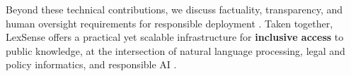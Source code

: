 {Beyond these technical contributions, we discuss factuality, transparency, and human oversight requirements for responsible deployment \cite{ji2023hallucination, maynez2020faithfulness, weidinger2021taxonomy}. Taken together, LexSense offers a practical yet scalable infrastructure for \textbf{inclusive access} to public knowledge, at the intersection of natural language processing, legal and policy informatics, and responsible AI \cite{bommasani2021foundation}.

}
